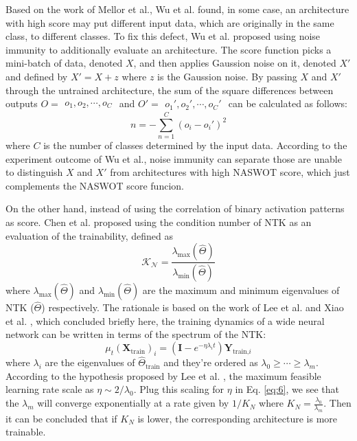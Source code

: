 \documentclass[sigconf]{acmart}
\begin{document}
    Based on the work of Mellor et al., Wu et al. \cite{10.1145/3491396.3506510} 
    found, in some case, an architecture with high score may put different 
    input data, which are originally in the same class, to different classes. 
    To fix this defect, Wu et al. proposed using noise immunity to additionally 
    evaluate an architecture. The score function picks a mini-batch of data, 
    denoted $X$, and then applies Gaussion noise on it, denoted $X'$ and defined 
    by $X'=X+z$ where $z$ is the Gaussion noise. By passing $X$ and $X'$ through 
    the untrained architecture, the sum of the square differences between outputs 
    $O=\begin{matrix}o_1,o_2,\cdots,o_C\end{matrix}$ and 
    $O'=\begin{matrix}o_1',o_2',\cdots,o_C'\end{matrix}$ can be calculated as 
    follows:
    \begin{equation}
        n=-\sum^C_{n=1}(o_i-o_i')^2
    \end{equation}
    where $C$ is the number of classes determined by the input data.
    According to the experiment outcome of Wu et al., noise immunity can separate 
    those are unable to distinguish $X$ and $X'$ from architectures with high NASWOT 
    score, which just complements the NASWOT score funcion.
    
    On the other hand, instead of using the correlation of binary activation 
    patterns as score. Chen et al. proposed using the condition number of NTK 
    as an evaluation of the trainability, defined as
    \begin{equation}
        \mathcal{K_N}=\frac{\lambda_{\textrm{max}}(\hat\Theta)}{\lambda_{\textrm{min}}(\hat\Theta)}
    \end{equation}
    where $\lambda_{\textrm{max}}(\hat\Theta)$ and $\lambda_{\textrm{min}}(\hat\Theta)$ 
    are the maximum and minimum eigenvalues of NTK ($\hat\Theta$) respectively.
    The rationale is based on the work of Lee et al. \cite{Lee_2020} and 
    Xiao et al. \cite{https://doi.org/10.48550/arxiv.1912.13053}, which concluded briefly here, 
    the training dynamics of a wide neural network can be written in terms of the 
    spectrum of the NTK:
    \begin{equation}\label{eq:6}
        \mu_t(\textbf{X}_{\textrm{train}})_i=(\textbf{I}-e^{-\eta\lambda_it})\textbf{Y}_{\textrm{train,}i}
    \end{equation}
    where $\lambda_i$ are the eigenvalues of $\hat\Theta_{\textrm{train}}$ 
    and they're ordered as $\lambda_0\geq\cdots\geq\lambda_m$. 
    According to the hypothesis proposed by Lee et al. \cite{Lee_2020}, the maximum 
    feasible learning rate scale as $\eta\sim2/\lambda_0$. Plug this scaling for 
    $\eta$ in Eq. \ref{eq:6}, we see that the $\lambda_m$ will converge exponentially 
    at a rate given by $1/K_N$ where $K_N=\frac{\lambda_0}{\lambda_m}$.
    Then it can be concluded that if $K_N$ is lower, the corresponding architecture is 
    more trainable.
\end{document}
